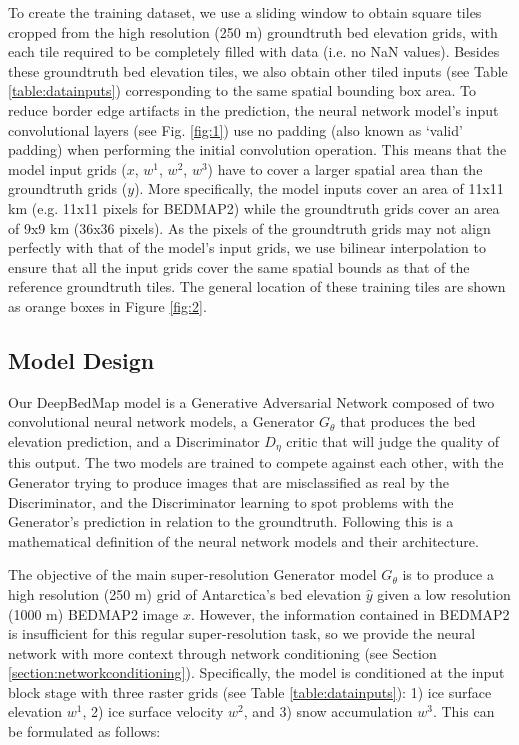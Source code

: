 \documentclass[tc, manuscript]{copernicus}
\begin{document}
To create the training dataset, we use a sliding window to obtain square tiles cropped from the high resolution (250 m) groundtruth bed elevation grids, with each tile required to be completely filled with data (i.e. no NaN values).
Besides these groundtruth bed elevation tiles, we also obtain other tiled inputs (see Table \ref{table:datainputs}) corresponding to the same spatial bounding box area.
To reduce border edge artifacts in the prediction, the neural network model's input convolutional layers (see Fig. \ref{fig:1}) use no padding (also known as `valid' padding) when performing the initial convolution operation.
This means that the model input grids ($x$, $w^1$, $w^2$, $w^3$) have to cover a larger spatial area than the groundtruth grids ($y$).
More specifically, the model inputs cover an area of 11x11 km (e.g. 11x11 pixels for BEDMAP2) while the groundtruth grids cover an area of 9x9 km (36x36 pixels).
As the pixels of the groundtruth grids may not align perfectly with that of the model's input grids, we use bilinear interpolation to ensure that all the input grids cover the same spatial bounds as that of the reference groundtruth tiles.
The general location of these training tiles are shown as orange boxes in Figure \ref{fig:2}.

\subsection{Model Design} \label{section:modeldesign}

Our DeepBedMap model is a Generative Adversarial Network \citep{GoodfellowGenerativeAdversarialNetworks2014} composed of two convolutional neural network models, a Generator $G_\theta$ that produces the bed elevation prediction, and a Discriminator $D_\eta$ critic that will judge the quality of this output.
The two models are trained to compete against each other, with the Generator trying to produce images that are misclassified as real by the Discriminator, and the Discriminator learning to spot problems with the Generator's prediction in relation to the groundtruth.
Following this is a mathematical definition of the neural network models and their architecture.

The objective of the main super-resolution Generator model $G_\theta$ is to produce a high resolution (250 m) grid of Antarctica's bed elevation $\hat{y}$ given a low resolution (1000 m) BEDMAP2 \citep{FretwellBedmap2improvedice2013} image $x$.
However, the information contained in BEDMAP2 is insufficient for this regular super-resolution task, so we provide the neural network with more context through network conditioning (see Section \ref{section:networkconditioning}).
Specifically, the model is conditioned at the input block stage with three raster grids (see Table \ref{table:datainputs}): 1) ice surface elevation $w^1$, 2) ice surface velocity $w^2$, and 3) snow accumulation $w^3$.
This can be formulated as follows:
\end{document}
